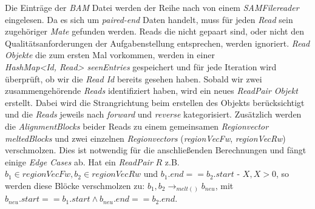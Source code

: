 \documentclass[12pt]{article}
\begin{document}
Die Einträge der \textit{BAM} Datei werden der Reihe nach von einem \textit{SAMFilereader} eingelesen. Da es
sich um \textit{paired-end} Daten handelt, muss für jeden \textit{Read} sein zugehöriger \textit{Mate} gefunden werden. 
Reads die nicht gepaart sind, oder nicht den Qualitätsanforderungen der Aufgabenstellung entsprechen,
werden ignoriert.
\textit{Read Objekte} die zum ersten Mal vorkommen, werden in einer \\ \textit{HashMap<Id, Read> seenEntries}
gespeichert und für jede Iteration wird überprüft, ob wir die \textit{Read Id} bereits gesehen haben.
Sobald wir zwei zusammengehörende \textit{Reads} identifiziert haben, wird ein neues
\textit{ReadPair Objekt} erstellt. Dabei wird die Strangrichtung beim erstellen des Objekts berücksichtigt und
die \textit{Reads} jeweils nach \textit{forward} und \textit{reverse} kategorisiert.
Zusätzlich werden die \textit{AlignmentBlocks} beider Reads zu einem gemeinsamen \textit{Regionvector meltedBlocks} und
zwei einzelnen \textit{Regionvectors} (\textit{regionVecFw}, \textit{regionVecRw}) verschmolzen.
Dies ist notwendig für die anschlie\ss enden Berechnungen und fängt einige \textit{Edge Cases} ab.
Hat ein \textit{ReadPair} $R$ z.B. $b_{1} \in \textit{regionVecFw}, b_{2} \in \textit{regionVecRw}$ und $b_{1}.\textit{end} == b_{2}.\textit{start - X}, X > 0$,
so werden diese Blöcke verschmolzen zu: $b_{1}, b_{2} \rightarrow_{melt()} b_{neu}$, mit $b_{neu}.\textit{start} == b_{1}.\textit{start} \land b_{neu}.\textit{end} == b_{2}.\textit{end}$.
\newpage
\end{document}
